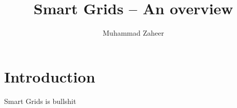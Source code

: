 \documentclass[11pt,a4paper]{article}
\begin{document}
\author{Muhammad Zaheer}
\title{Smart Grids -- An overview}
\maketitle

\section{Introduction}
Smart Grids is bullshit
\end{document}
